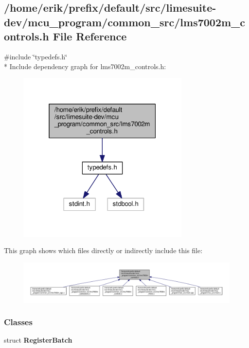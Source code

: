 \subsection{/home/erik/prefix/default/src/limesuite-\/dev/mcu\+\_\+program/common\+\_\+src/lms7002m\+\_\+controls.h File Reference}
\label{lms7002m__controls_8h}
{\ttfamily \#include \char`\"{}typedefs.\+h\char`\"{}}\\*
Include dependency graph for lms7002m\+\_\+controls.\+h\+:
\nopagebreak
\begin{figure}[H]
\begin{center}
\leavevmode
\includegraphics[width=244pt]{d4/dcd/lms7002m__controls_8h__incl}
\end{center}
\end{figure}
This graph shows which files directly or indirectly include this file\+:
\nopagebreak
\begin{figure}[H]
\begin{center}
\leavevmode
\includegraphics[width=350pt]{de/df0/lms7002m__controls_8h__dep__incl}
\end{center}
\end{figure}
\subsubsection*{Classes}
\begin{DoxyCompactItemize}
\item 
struct {\bf Register\+Batch}
\end{DoxyCompactItemize}
